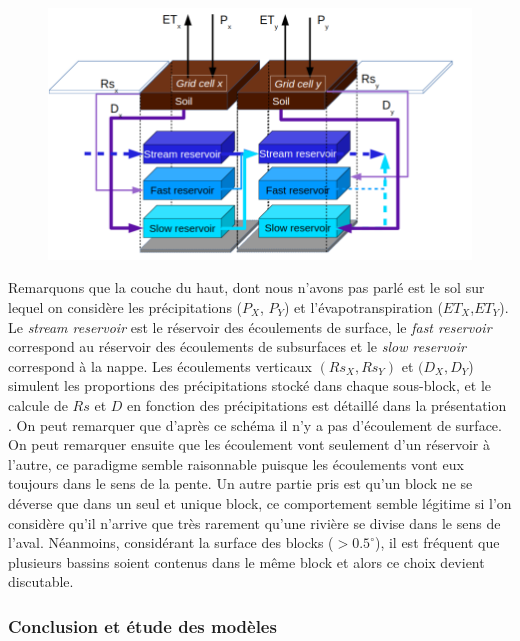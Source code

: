 \documentclass[a4paper,11pt]{article}
\numberwithin{equation}{section}
\begin{document}
\begin{figure}[h]
	\begin{center}
		\includegraphics[scale=0.3]{Orchidee_interaction.png}
		
	\end{center}
	\label{fig:Orchidee-interact}
\end{figure}

Remarquons que la couche du haut, dont nous n'avons pas parlé est le sol sur lequel on considère les précipitations ($P_X$, $P_Y$) et l'évapotranspiration ($ET_X$,$ET_Y$). Le \textit{stream reservoir} est le réservoir des écoulements de surface, le \textit{fast reservoir} correspond au réservoir des écoulements de subsurfaces et le \textit{slow reservoir} correspond à la nappe. Les écoulements verticaux $(Rs_X,Rs_Y)$ et $(D_X,D_Y$) simulent les proportions des précipitations stocké dans chaque sous-block, et le calcule de $Rs$ et $D$ en fonction des précipitations est détaillé dans la présentation \cite{gumiberteau2017}. On peut remarquer que d'après ce schéma il n'y a pas d'écoulement de surface.
On peut remarquer ensuite que les écoulement vont seulement d'un réservoir à l'autre, ce paradigme semble raisonnable puisque les écoulements vont eux toujours dans le sens de la pente. Un autre partie pris est qu'un block ne se déverse que dans un seul et unique block, ce comportement semble légitime si l'on considère qu'il n'arrive que très rarement qu'une rivière se divise dans le sens de l'aval. Néanmoins, considérant la surface des blocks ($>0.5^{\circ}$), il est fréquent que plusieurs bassins soient contenus dans le même block et alors ce choix devient discutable.

\subsubsection{Conclusion et étude des modèles}
\end{document}
